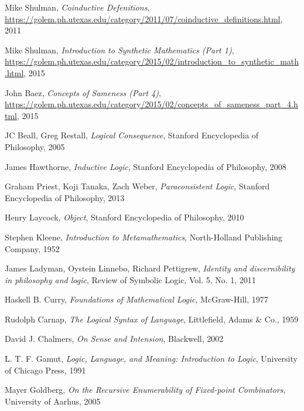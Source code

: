 \documentclass{article}
\begin{document}
\begin{thebibliography}{99}
    Mike Shulman,
    \emph{Coinductive Defenitions},
    \url{https://golem.ph.utexas.edu/category/2011/07/coinductive_definitions.html},
    2011

    Mike Shulman,
    \emph{Introduction to Synthetic Mathematics (Part 1)},
    \url{https://golem.ph.utexas.edu/category/2015/02/introduction_to_synthetic_math.html},
    2015

    John Baez,
    \emph{Concepts of Sameness (Part 4)},
    \url{https://golem.ph.utexas.edu/category/2015/02/concepts_of_sameness_part_4.html},
    2015

    JC Beall, Greg Restall,
    \emph{Logical Consequence},
    Stanford Encyclopedia of Philosophy,
    2005

    James Hawthorne,
    \emph{Inductive Logic},
    Stanford Encyclopedia of Philosophy,
    2008

    Graham Priest, Koji Tanaka, Zach Weber,
    \emph{Paraconsistent Logic},
    Stanford Encyclopedia of Philosophy,
    2013

    Henry Laycock,
    \emph{Object},
    Stanford Encyclopedia of Philosophy,
    2010

    Stephen Kleene,
    \emph{Introduction to Metamathematics},
    North-Holland Publishing Company,
    1952

    James Ladyman, \/Oystein Linnebo, Richard Pettigrew,
    \emph{Identity and discernibility in philosophy and logic},
    Review of Symbolic Logic, Vol. 5, No. 1,
    2011

    Haskell B. Curry,
    \emph{Foundations of Mathematical Logic},
    McGraw-Hill,
    1977

    Rudolph Carnap,
    \emph{The Logical Syntax of Language},
    Littlefield, Adams \& Co.,
    1959

    David J. Chalmers,
    \emph{On Sense and Intension},
    Blackwell,
    2002

    L. T. F. Gamut,
    \emph{Logic, Language, and Meaning: Introduction to Logic},
    University of Chicago Press,
    1991

    Mayer Goldberg,
    \emph{On the Recursive Enumerability of Fixed-point Combinators},
    University of Aarhus,
    2005


\end{thebibliography}
\end{document}
